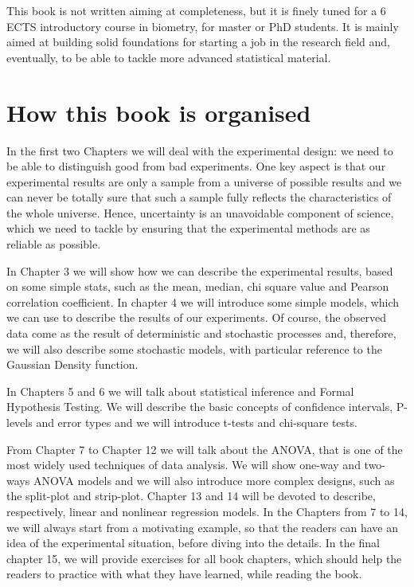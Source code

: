 \documentclass[a4paper,12pt,oneside]{book}
\begin{document}
This book is not written aiming at completeness, but it is finely tuned for a 6 ECTS introductory course in biometry, for master or PhD students. It is mainly aimed at building solid foundations for starting a job in the research field and, eventually, to be able to tackle more advanced statistical material.

\hypertarget{how-this-book-is-organised}{%
\section*{How this book is organised}\label{how-this-book-is-organised}}

In the first two Chapters we will deal with the experimental design: we need to be able to distinguish good from bad experiments. One key aspect is that our experimental results are only a sample from a universe of possible results and we can never be totally sure that such a sample fully reflects the characteristics of the whole universe. Hence, uncertainty is an unavoidable component of science, which we need to tackle by ensuring that the experimental methods are as reliable as possible.

In Chapter 3 we will show how we can describe the experimental results, based on some simple stats, such as the mean, median, chi square value and Pearson correlation coefficient. In chapter 4 we will introduce some simple models, which we can use to describe the results of our experiments. Of course, the observed data come as the result of deterministic and stochastic processes and, therefore, we will also describe some stochastic models, with particular reference to the Gaussian Density function.

In Chapters 5 and 6 we will talk about statistical inference and Formal Hypothesis Testing. We will describe the basic concepts of confidence intervals, P-levels and error types and we will introduce t-tests and chi-square tests.

From Chapter 7 to Chapter 12 we will talk about the ANOVA, that is one of the most widely used techniques of data analysis. We will show one-way and two-ways ANOVA models and we will also introduce more complex designs, such as the split-plot and strip-plot. Chapter 13 and 14 will be devoted to describe, respectively, linear and nonlinear regression models. In the Chapters from 7 to 14, we will always start from a motivating example, so that the readers can have an idea of the experimental situation, before diving into the details. In the final chapter 15, we will provide exercises for all book chapters, which should help the readers to practice with what they have learned, while reading the book.
\end{document}
